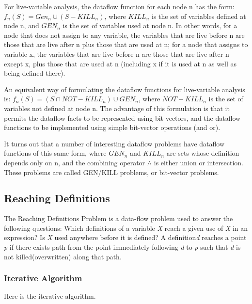 For live-variable analysis, the dataflow function for each node n has the form: 
\(f_n(S) = Gen_n \cup (S - KILL_n)\), where \(KILL_n\) is the set of variables defined at node n, 
and \(GEN_n\) is the set of variables used at node n. In other words, for a node that does not 
assign to any variable, the variables that are live before n are those that are live after 
n plus those that are used at n; for a node that assigns to variable x, the variables that are 
live before n are those that are live after n except x, plus those that are used at n 
(including x if it is used at n as well as being defined there).

An equivalent way of formulating the dataflow functions for live-variable analysis is: 
\(f_n(S) = (S \cap NOT-KILL_n) \cup GEN_n\), where \(NOT-KILL_n\) is the set of variables not defined
 at node n. The advantage of this formulation is that it permits the dataflow facts to be 
 represented using bit vectors, and the dataflow functions to be implemented using simple 
 bit-vector operations (and or).

It turns out that a number of interesting dataflow problems have dataflow functions of this 
same form, where \(GEN_n\) and \(KILL_n\) are sets whose definition depends only on n, and the combining 
operator \(\wedge\) is either union or intersection. These problems are called GEN/KILL problems, 
or bit-vector problems.




\subsection{Reaching Definitions}

The Reaching Definitions Problem is a data-flow problem used to answer the
following questions: Which definitions of a variable \textit{X} reach a given use of \textit{X} in
an expression? Is \textit{X} used anywhere before it is defined? A definition\textit{d} reaches a point \textit{p} if there exists path 
from the point immediately following \textit{d} to \textit{p} such that \textit{d} is not killed(overwritten) along that path.



\subsubsection{Iterative   Algorithm}

Here is the iterative  algorithm.



